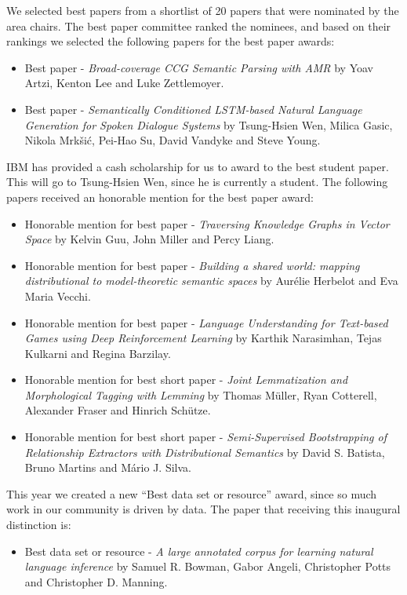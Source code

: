 We selected best papers from a shortlist of 20 papers that were nominated
by the area chairs. The best paper committee ranked the nominees,
and based on their rankings we selected the following papers for the
best paper awards: 
\begin{itemize}[itemsep=0pt]
\item Best paper - \textit{Broad-coverage CCG Semantic Parsing with AMR}
by Yoav Artzi, Kenton Lee and Luke Zettlemoyer. 
\item Best paper - \textit{Semantically Conditioned LSTM-based Natural Language
Generation for Spoken Dialogue Systems} by Tsung-Hsien Wen, Milica
Gasic, Nikola Mrkšić, Pei-Hao Su, David Vandyke and Steve Young.
\end{itemize}
IBM has provided a cash scholarship for us to award to the best student
paper. This will go to Tsung-Hsien Wen, since he is currently a student.
The following papers received an honorable mention for the best paper
award: 
\begin{itemize}[itemsep=0pt]
\item Honorable mention for best paper - \textit{Traversing Knowledge Graphs
in Vector Space} by Kelvin Guu, John Miller and Percy Liang. 
\item Honorable mention for best paper - \textit{Building a shared world:
mapping distributional to model-theoretic semantic spaces} by Aurélie
Herbelot and Eva Maria Vecchi. 
\item Honorable mention for best paper - \textit{Language Understanding
for Text-based Games using Deep Reinforcement Learning } by Karthik
Narasimhan, Tejas Kulkarni and Regina Barzilay. 
\item Honorable mention for best short paper - \textit{Joint Lemmatization
and Morphological Tagging with Lemming} by Thomas Müller, Ryan Cotterell,
Alexander Fraser and Hinrich Schütze. 
\item Honorable mention for best short paper - \textit{Semi-Supervised Bootstrapping
of Relationship Extractors with Distributional Semantics} by David
S. Batista, Bruno Martins and Mário J. Silva.
\end{itemize}
This year we created a new ``Best data set or resource'' award,
since so much work in our community is driven by data. The paper that
receiving this inaugural distinction is: 
\begin{itemize}[itemsep=0pt]
\item Best data set or resource - \textit{A large annotated corpus for
learning natural language inference} by Samuel R. Bowman, Gabor Angeli,
Christopher Potts and Christopher D. Manning.
\end{itemize}
